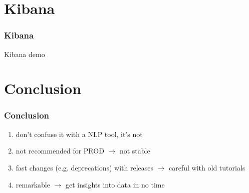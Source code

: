 \documentclass{beamer}
\begin{document}
\section{Kibana}
\begin{frame}
  \frametitle{Kibana}
  Kibana demo
\end{frame}

\section{Conclusion}
\begin{frame}
  \frametitle{Conclusion}
  \begin{enumerate}
   \item don't confuse it with a NLP tool, it's not
   \item not recommended for PROD $\rightarrow$ not stable
   \item fast changes (e.g. deprecations) with releases $\rightarrow$ careful with old tutorials
   \item remarkable $\rightarrow$ get insights into data in no time
  \end{enumerate}
\end{frame}
\end{document}
